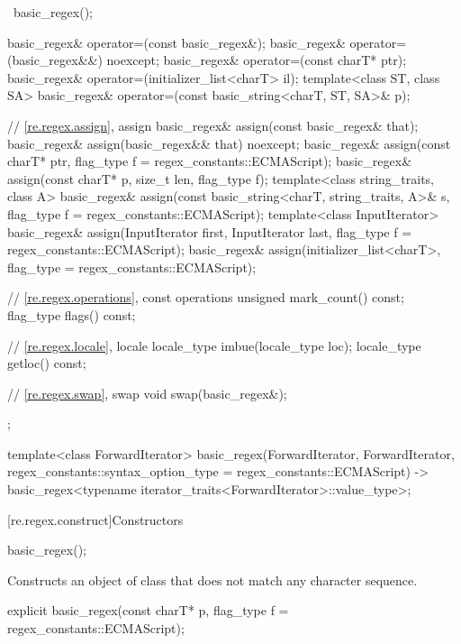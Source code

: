 \begin{codeblock}
{{      ~basic_regex();

      basic_regex& operator=(const basic_regex&);
      basic_regex& operator=(basic_regex&&) noexcept;
      basic_regex& operator=(const charT* ptr);
      basic_regex& operator=(initializer_list<charT> il);
      template<class ST, class SA>
        basic_regex& operator=(const basic_string<charT, ST, SA>& p);

      // \ref{re.regex.assign}, assign
      basic_regex& assign(const basic_regex& that);
      basic_regex& assign(basic_regex&& that) noexcept;
      basic_regex& assign(const charT* ptr, flag_type f = regex_constants::ECMAScript);
      basic_regex& assign(const charT* p, size_t len, flag_type f);
      template<class string_traits, class A>
        basic_regex& assign(const basic_string<charT, string_traits, A>& s,
                            flag_type f = regex_constants::ECMAScript);
      template<class InputIterator>
        basic_regex& assign(InputIterator first, InputIterator last,
                            flag_type f = regex_constants::ECMAScript);
      basic_regex& assign(initializer_list<charT>,
                          flag_type = regex_constants::ECMAScript);

      // \ref{re.regex.operations}, const operations
      unsigned mark_count() const;
      flag_type flags() const;

      // \ref{re.regex.locale}, locale
      locale_type imbue(locale_type loc);
      locale_type getloc() const;

      // \ref{re.regex.swap}, swap
      void swap(basic_regex&);
    };

  template<class ForwardIterator>
    basic_regex(ForwardIterator, ForwardIterator,
                regex_constants::syntax_option_type = regex_constants::ECMAScript)
      -> basic_regex<typename iterator_traits<ForwardIterator>::value_type>;
}
\end{codeblock}

[re.regex.construct]{Constructors}

%
\begin{itemdecl}
basic_regex();
\end{itemdecl}

\begin{itemdescr}
\pnum
\effects  Constructs an object of class  that
does not match any character sequence.
\end{itemdescr}

%
\begin{itemdecl}
explicit basic_regex(const charT* p, flag_type f = regex_constants::ECMAScript);
\end{itemdecl}

